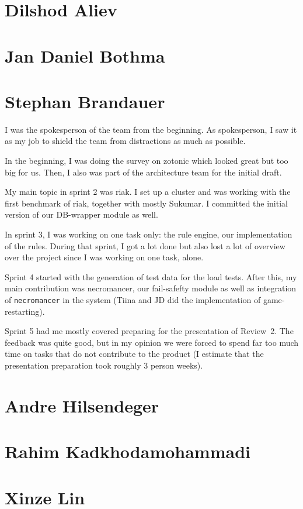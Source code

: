 \documentclass[11pt,a4paper]{report}
\begin{document}
\section{Dilshod Aliev}
\section{Jan Daniel Bothma}
\section{Stephan Brandauer}
I was the spokesperson of the team from the beginning. As spokesperson,
I saw it as my job to shield the team from distractions as much as possible.

In the beginning, I was doing the survey on zotonic which looked great but too
big for us. Then, I also was part of the architecture team for the initial
draft.

My main topic in sprint 2 was riak. I set up a cluster and was working with the
first benchmark of riak, together with mostly Sukumar.
I committed the initial version of our DB-wrapper module as well.

In sprint 3, I was working on one task only: the rule engine, our implementation
of the rules. During that sprint, I got a lot done but also lost a lot of
overview over the project since I was working on one task, alone.

Sprint 4 started with the generation of test data for the load tests. After
this, my main contribution was necromancer, our fail-safefty module as well as
integration of {\tt necromancer} in the system (Tiina and JD did the
implementation of game-restarting).

Sprint 5 had me mostly covered preparing for the presentation of Review~2.
The feedback was quite good, but in my opinion we were forced to spend far too
much time on tasks that do not contribute to the product (I estimate that the
presentation preparation took roughly 3 person weeks).
\section{Andre Hilsendeger}
\section{Rahim Kadkhodamohammadi}
\section{Xinze Lin}
\end{document}
